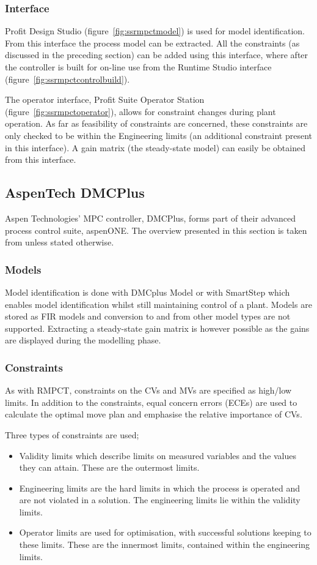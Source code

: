 \subsubsection{Interface}
Profit Design Studio (figure~\ref{fig:ssrmpctmodel}) is used for model identification.
From this interface the process model can be extracted.
All the constraints (as discussed in the preceding section) can be added using this interface, where after the controller is built for on-line use from the Runtime Studio interface (figure~\ref{fig:ssrmpctcontrolbuild}).

The operator interface, Profit Suite Operator Station (figure~\ref{fig:ssrmpctoperator}), allows for constraint changes during plant operation.
As far as feasibility of constraints are concerned, these constraints are only checked to be within the Engineering limits (an additional constraint present in this interface).
A gain matrix (the steady-state model) can easily be obtained from this interface.


\subsection{AspenTech DMCPlus}
Aspen Technologies' MPC controller, DMCPlus, forms part of their advanced process control suite, aspenONE.
The overview presented in this section is taken from \citet{aspentech1} unless stated otherwise.

\subsubsection{Models}
Model identification is done with DMCplus Model or with SmartStep which enables model identification whilst still maintaining control of a plant.
Models are stored as FIR models and conversion to and from other model types are not supported.
Extracting a steady-state gain matrix is however possible as the gains are displayed during the modelling phase.

\subsubsection{Constraints}
As with RMPCT, constraints on the CVs and MVs are specified as high/low limits.
In addition to the constraints, equal concern errors (ECEs) are used to calculate the optimal move plan and emphasise the relative importance of CVs.

Three types of constraints are used;
\begin{itemize}
\item Validity limits which describe limits on measured variables and the values they can attain.
These are the outermost limits.
\item Engineering limits are the hard limits in which the process is operated and are not violated in a solution.
The engineering limits lie within the validity limits.
\item Operator limits are used for optimisation, with successful solutions keeping to these limits.
These are the innermost limits, contained within the engineering limits.
\end{itemize}

